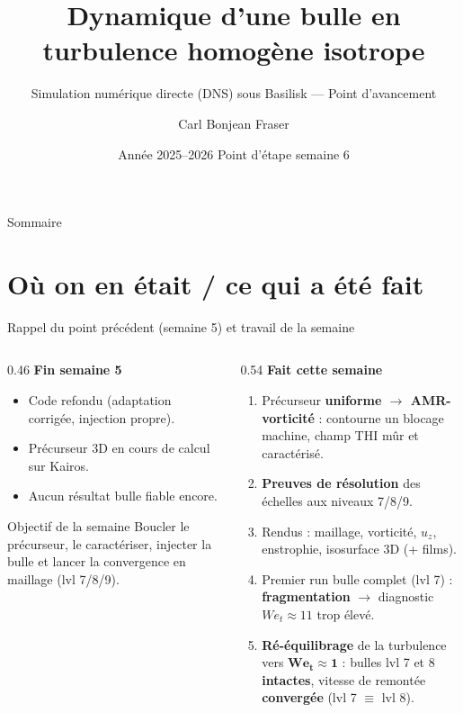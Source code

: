 \documentclass[11pt,aspectratio=169]{beamer}
\title[Bulle en turbulence -- DNS Basilisk]{%
  Dynamique d'une bulle en turbulence homogène isotrope}
\subtitle{Simulation numérique directe (DNS) sous Basilisk --- Point d'avancement}
\author[C. Bonjean Fraser]{Carl Bonjean Fraser}
\institute[IMFT / ENSEEIHT]{%
  ENSEEIHT --- Toulouse INP \quad\textbar\quad Institut de Mécanique des Fluides de Toulouse\\[2pt]
  \footnotesize Tuteurs : D.~Legendre \& R.~Zamansky}
\date{Année 2025--2026 \quad\textbar\quad Point d'étape semaine 6}
\begin{document}
{
\begin{frame}[plain]
  \titlepage
\end{frame}}

\begin{frame}{Sommaire}
  \tableofcontents
\end{frame}

\section{Où on en était / ce qui a été fait}
\begin{frame}{Rappel du point précédent (semaine 5) et travail de la semaine}
  \begin{columns}[T]
    \begin{column}{0.46\textwidth}
      \textbf{Fin semaine 5}
      \begin{itemize}
        \item Code refondu (adaptation corrigée, injection propre).
        \item Précurseur 3D en cours de calcul sur Kairos.
        \item Aucun résultat bulle fiable encore.
      \end{itemize}
      \vspace{0.4em}
      \begin{block}{Objectif de la semaine}
        Boucler le précurseur, le caractériser, injecter la bulle
        et lancer la convergence en maillage (lvl 7/8/9).
      \end{block}
    \end{column}
    \begin{column}{0.54\textwidth}
      \textbf{Fait cette semaine}
      \begin{enumerate}
        \item Précurseur \textbf{uniforme $\to$ AMR-vorticité} : contourne un
              blocage machine, champ THI mûr et caractérisé.
        \item \textbf{Preuves de résolution} des échelles aux niveaux 7/8/9.
        \item Rendus : maillage, vorticité, $u_z$, enstrophie, isosurface 3D
              (+ films).
        \item Premier run bulle complet (lvl 7) : \textcolor{warnred}{%
              \textbf{fragmentation}} $\to$ diagnostic $We_t \approx 11$
              trop élevé.
        \item \textbf{Ré-équilibrage} de la turbulence vers
              $\bm{We_t \approx 1}$ : bulles lvl 7 et 8 \textbf{intactes},
              vitesse de remontée \textbf{convergée} (lvl 7 $\equiv$ lvl 8).
      \end{enumerate}
    \end{column}
  \end{columns}
\end{frame}
\end{document}
